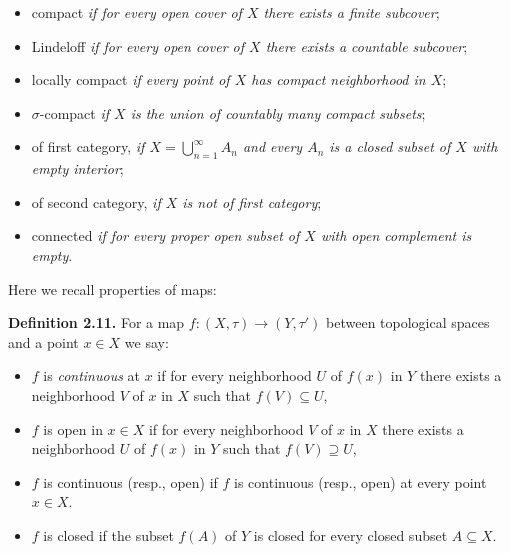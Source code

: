 \documentclass[12pt]{article}
\begin{document}
    
        \begin{itemize}

            \item compact \emph{if for every open cover of $ X $ there exists a finite subcover};
            
            \item Lindeloff \emph{if for every open cover of $ X $ there exists a countable subcover};

            \item locally compact \emph{if every point of $ X $ has compact neighborhood in $ X $};
         
            \item $\sigma$-compact \emph{if $ X $ is the union of countably many compact subsets};
            
            \item of first category, \emph{if $ X = \bigcup^{\infty}_{n=1} A_n $ and every $ A_n $ is a closed subset of $ X $ with empty interior};
            
            \item of second category, \emph{if $ X $ is not of first category};
            
            \item connected \emph{if for every proper open subset of $ X $ with open complement is empty}.

        \end{itemize}


            Here we recall properties of maps:
    

    \textbf{Definition 2.11.} For a map $ f : (X, \tau) \to (Y, \tau') $ between topological spaces and a point $ x \in X $ we say:

    
            \begin{itemize}
    
                \item $ f $ is \emph{continuous} at $ x $ if for every neighborhood $ U $ of $ f(x) $ in $ Y $ there exists a neighborhood $ V $ of $ x $ in $ X $
                such that $ f(V) \subseteq U $,
                
                \item $ f $ is open in $ x \in X $ if for every neighborhood $ V $ of $ x $ in $ X $ there exists a neighborhood $ U $ of $ f(x) $ in $ Y $ such
                that $ f(V) \supseteq U $,
    
                \item $ f $ is continuous (resp., open) if $ f $ is continuous (resp., open) at every point $ x \in X $.
                
                \item $ f $ is closed if the subset $ f(A) $ of $ Y $ is closed for every closed subset $ A \subseteq X $.
                
            \end{itemize}
\end{document}
